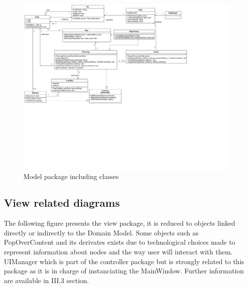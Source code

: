 \documentclass[paper=a4,fontsize=11pt]{report}
\numberwithin{equation}{section}		%
\numberwithin{figure}{section}		%
\numberwithin{table}{section}		%
\begin{document}
\begin{center}
\vspace*{-6cm}
\begin{figure}[H]
\centering
\includegraphics[scale=0.47,angle=90]{figures/model-class.png}
\caption{Model package including classes}
\end{figure}
\end{center}

\subsection{View related diagrams}
\label{subsec:view-related-diagrams}

The following figure presents the view package, it is reduced to objects linked directly or indirectly to the Domain Model. Some objects such as PopOverContent and its derivates exists due to technological choices made to represent information about nodes and the way user will interact with them. UIManager which is part of the controller package but is strongly related to this package as it is in charge of instanciating the MainWindow. Further information are available in III.3 section.
\end{document}
